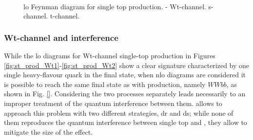 \begin{figure}[h]
\centering 
{}
 \\
\caption{\Gls{lo} Feynman diagram for single top production. - Wt-channel. 
 s-channel.  t-channel.}\label{fig:single_top_prod}
\end{figure}

\subsubsection*{Wt-channel and \ttbar interference}

While the \gls{lo} diagrams for Wt-channel single-top production in Figures \ref{fig:st_prod_Wt1}-\ref{fig:st_prod_Wt2} show a clear signature characterized by one single heavy-flavour quark in the final state,
when \gls{nlo} diagrams are considered it is possible to reach the same final state as with \ttbar production, namely $WWbb$, as shown in Fig. \ref{}. 
Considering the two processes separately leads necessarily to an improper treatment of the quantum interference between them.
\PowhegBox allows to approach this problem with two different strategies, \gls{dr} and \gls{ds}; while none of them reproduces the quantum interference between single top and \ttbar, they allow to mitigate the size of the effect. 


